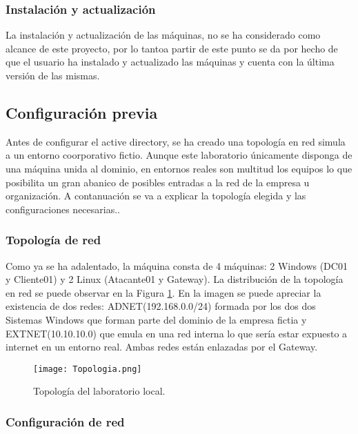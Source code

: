 \subsubsection{Instalación y actualización}

La instalación y actualización de las máquinas, no se ha considerado como alcance de este proyecto, por lo tantoa partir de este punto se da por hecho de que el usuario ha instalado y actualizado las máquinas y cuenta con la última versión de las mismas. 

\subsection{Configuración previa}

Antes de configurar el active directory, se ha creado una topología en red simula a un entorno coorporativo fictio. Aunque este laboratorio únicamente disponga de una máquina unida al dominio, en entornos reales son multitud los equipos lo que posibilita un gran abanico de posibles entradas a la red de la empresa u organización. A contanuación se va a explicar la topología elegida y las configuraciones necesarias.. 

\subsubsection{Topología de red}

Como ya se ha adalentado, la máquina consta de 4 máquinas: 2 Windows (DC01 y Cliente01) y 2 Linux (Atacante01 y Gateway). La distribución de la topología en red se puede observar en la Figura \ref{Topología}. En la imagen se puede apreciar la existencia de dos redes: ADNET(192.168.0.0/24) formada por los dos dos Sistemas Windows que forman parte del dominio de la empresa fictia y EXTNET(10.10.10.0) que emula en una red interna lo que sería estar expuesto a internet en un entorno real. Ambas redes están enlazadas por el Gateway. 

\begin{figure}[t!] %
\begin{center}
\texttt{[image: Topologia.png]}
\end{center}
\caption{Topología del laboratorio local.}
\label{Topología}
\end{figure}

\subsubsection{Configuración de red}

